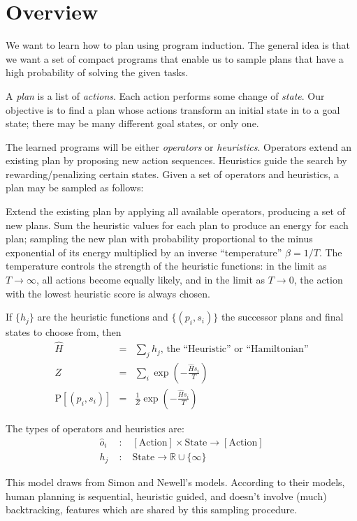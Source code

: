 \documentclass{article}
\begin{document}
\section{Overview}
We want to learn how to plan using program induction.
The general idea is that we want a set of compact programs that enable us to sample plans that have a high probability of solving the given tasks.


A \emph{plan} is a list of \emph{actions}.
Each action performs some change of \emph{state}.
Our objective is to find a plan whose actions transform an initial state in to a goal state; there may be many different goal states, or only one.

The learned programs will be either \emph{operators} or \emph{heuristics}.
Operators extend an existing plan by proposing new action sequences.
Heuristics guide the search by rewarding/penalizing certain states.
Given a set of operators and heuristics, a plan may be sampled as follows:

Extend the existing plan by applying all available operators, producing a set of new plans.
Sum the heuristic values for each plan to produce an energy for each plan;
sampling the new plan with probability proportional to the minus exponential of its energy multiplied by an inverse ``temperature'' $\beta=1/T$.
The temperature controls the strength of the heuristic functions:
in the limit as $T\to\infty$, all actions become equally likely, and in the limit as $T\to 0$, the action with the lowest heuristic score is always chosen.

If $\{h_j\}$ are the heuristic functions and $\{(p_i,s_i)\}$ the successor plans and final states to choose from, then
\begin{eqnarray}
\hat{H} &=& \sum_j h_j\mbox{, the ``Heuristic'' or ``Hamiltonian''}\\
Z &=& \sum_i \exp\left( -\frac{\hat{H} s_i}{T} \right)\\
\mbox{P}[(p_i,s_i)] &=& \frac{1}{Z} \exp\left( -\frac{\hat{H} s_i}{T} \right)
\end{eqnarray}

The types of operators and heuristics are:
\begin{eqnarray}
\hat{o}_i \; &:& \; [\mbox{Action}]\times \mbox{State} \to [\mbox{Action}]\\
h_j \; &:& \; \mbox{State} \to \mathbb{R}\cup\{\infty\}
\end{eqnarray}

This model draws from Simon and Newell's models.
According to their models, human planning is sequential, heuristic guided, and doesn't involve (much) backtracking, features which are shared by this sampling procedure.
\end{document}

